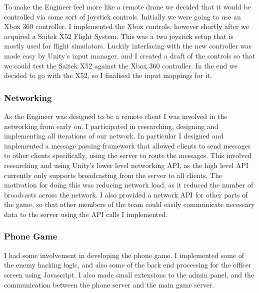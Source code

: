 \documentclass[a4paper,11pt]{article}
\begin{document}
To make the Engineer feel more like a remote drone we decided that it would be controlled via some sort of joystick controls. Initially we were going to use an Xbox 360 controller. I implemented the Xbox controls, however shortly after we acquired a Saitek X52 Flight System. This was a two joystick setup that is mostly used for flight simulators. Luckily interfacing with the new controller was made easy by Unity’s input manager, and I created a draft of the controls so that we could test the Saitek X52 against the Xbox 360 controller. In the end we decided to go with the X52, so I finalised the input mappings for it.

\subsubsection{Networking}

As the Engineer was designed to be a remote client I was involved in the networking from early on. I participated in researching, designing and implementing all iterations of our network. In particular I designed and implemented a message passing framework that allowed clients to send messages to other clients specifically, using the server to route the messages. This involved researching and using Unity’s lower level networking API, as the high level API currently only supports broadcasting from the server to all clients. The motivation for doing this was reducing network load, as it reduced the number of broadcasts across the network. I also provided a network API for other parts of the game, so that other members of the team could easily communicate necessary data to the server using the API calls I implemented.

\subsubsection{Phone Game}

I had some involvement in developing the phone game. I implemented some of the enemy hacking logic, and also some of the back end processing for the officer screen using Javascript. I also made small extensions to the admin panel, and the communication between the phone server and the main game server.

\clearpage
\end{document}
